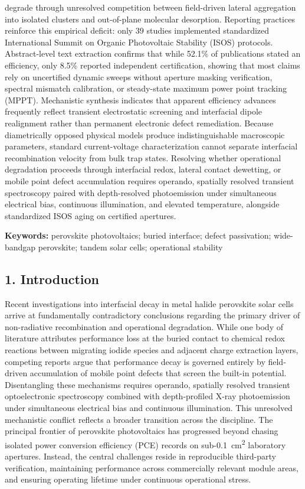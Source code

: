 \documentclass[
  11pt,
]{article}
\begin{document}
degrade through unresolved competition between field-driven lateral
aggregation into isolated clusters and out-of-plane molecular
desorption. Reporting practices reinforce this empirical deficit: only
39 studies implemented standardized International Summit on Organic
Photovoltaic Stability (ISOS) protocols. Abstract-level text extraction
confirms that while 52.1\% of publications stated an efficiency, only
8.5\% reported independent certification, showing that most claims rely
on uncertified dynamic sweeps without aperture masking verification,
spectral mismatch calibration, or steady-state maximum power point
tracking (MPPT). Mechanistic synthesis indicates that apparent
efficiency advances frequently reflect transient electrostatic screening
and interfacial dipole realignment rather than permanent electronic
defect remediation. Because diametrically opposed physical models
produce indistinguishable macroscopic parameters, standard
current-voltage characterization cannot separate interfacial
recombination velocity from bulk trap states. Resolving whether
operational degradation proceeds through interfacial redox, lateral
contact dewetting, or mobile point defect accumulation requires
operando, spatially resolved transient spectroscopy paired with
depth-resolved photoemission under simultaneous electrical bias,
continuous illumination, and elevated temperature, alongside
standardized ISOS aging on certified apertures.

\textbf{Keywords:} perovskite photovoltaics; buried interface; defect
passivation; wide-bandgap perovskite; tandem solar cells; operational
stability

\subsection{1. Introduction}\label{introduction}

Recent investigations into interfacial decay in metal halide perovskite
solar cells arrive at fundamentally contradictory conclusions regarding
the primary driver of non-radiative recombination and operational
degradation. While one body of literature attributes performance loss at
the buried contact to chemical redox reactions between migrating iodide
species and adjacent charge extraction layers, competing reports argue
that performance decay is governed entirely by field-driven accumulation
of mobile point defects that screen the built-in potential.
Disentangling these mechanisms requires operando, spatially resolved
transient optoelectronic spectroscopy combined with depth-profiled X-ray
photoemission under simultaneous electrical bias and continuous
illumination. This unresolved mechanistic conflict reflects a broader
transition across the discipline. The principal frontier of perovskite
photovoltaics has progressed beyond chasing isolated power conversion
efficiency (PCE) records on sub-\qty{0.1}{\centi\meter\squared}
laboratory apertures. Instead, the central challenges reside in
reproducible third-party verification, maintaining performance across
commercially relevant module areas, and ensuring operating lifetime
under continuous operational stress.
\end{document}
